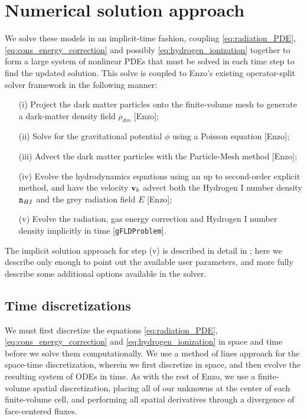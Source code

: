 \documentclass[letterpaper,10pt]{article}
\renewcommand{\(}{\left(}
\renewcommand{\)}{\right)}
\newcommand{\vb}{{\bf v}_b}
\newcommand{\mn}{{\tt n}}
\begin{document}
\section{Numerical solution approach}
\label{sec:solution_approach}

We solve these models in an implicit-time fashion, coupling 
\eqref{eq:radiation_PDE}, \eqref{eq:cons_energy_correction} and
possibly \eqref{eq:hydrogen_ionization} together to form a large
system of nonlinear PDEs that must be solved in each time step to find
the updated solution.  This solve is coupled to Enzo's existing
operator-split solver framework in the following manner:
\begin{itemize}
\item[(i)] Project the dark matter particles onto the finite-volume
  mesh to generate a dark-matter density field $\rho_{dm}$ [Enzo];
\item[(ii)] Solve for the gravitational potential $\phi$ using a
  Poisson equation [Enzo];
\item[(iii)] Advect the dark matter particles with the Particle-Mesh
  method [Enzo];
\item[(iv)] Evolve the hydrodynamics equations using an up to
  second-order explicit method, and have the velocity $\vb$ advect
  both the Hydrogen I number density $\mn_{HI}$ and the grey radiation
  field $E$ [Enzo]; 
\item[(v)] Evolve the radiation, gas energy correction and Hydrogen I
  number density implicitly in time [{\tt gFLDProblem}].
\end{itemize}

The implicit solution approach for step (v) is described in detail in 
\cite{ReynoldsHayesPaschosNorman2009}; here we describe only enough
to point out the available user parameters, and more fully describe
some additional options available in the solver.

\subsection{Time discretizations}
\label{sec:iqss}

We must first discretize the equations \eqref{eq:radiation_PDE},
\eqref{eq:cons_energy_correction} and \eqref{eq:hydrogen_ionization}
in space and time before we solve them computationally.  We use a
method of lines approach for the space-time discretization, wherein we
first discretize in space, and then evolve the resulting system of
ODEs in time.  As with the rest of Enzo, we use a finite-volume
spatial discretization, placing all of our unknowns at the center of
each finite-volume cell, and performing all spatial derivatives
through a divergence of face-centered fluxes.  
\end{document}
